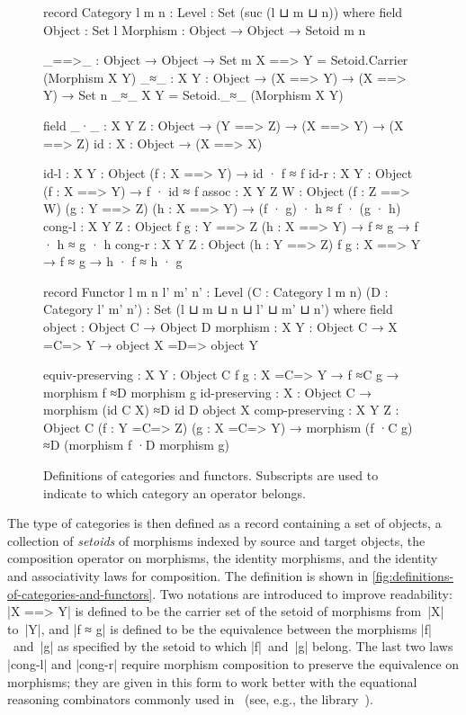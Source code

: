 \begin{figure}
\codefigure\small
\begin{code}
record Category {l m n : Level} : Set (suc (l ⊔ m ⊔ n)) where
  field
    Object    :  Set l
    Morphism  :  Object → Object → Setoid {m} {n}

  _==>_ : Object → Object → Set m
  X ==> Y = Setoid.Carrier (Morphism X Y)
  _≈_ : {X Y : Object} → (X ==> Y) → (X ==> Y) → Set n
  _≈_ {X} {Y} = Setoid._≈_ (Morphism X Y)

  field
    _·_  :   {X Y Z : Object} → (Y ==> Z) → (X ==> Y) → (X ==> Z)
    id   :   {X : Object} → (X ==> X)

    id-l    :  {X Y : Object} (f : X ==> Y) → id · f ≈ f
    id-r    :  {X Y : Object} (f : X ==> Y) → f · id ≈ f
    assoc   :  {X Y Z W : Object} (f : Z ==> W) (g : Y ==> Z) (h : X ==> Y) →
               (f · g) · h ≈ f · (g · h)
    cong-l  :  {X Y Z : Object} {f g : Y ==> Z} (h : X ==> Y) → f ≈ g → f · h ≈ g · h
    cong-r  :  {X Y Z : Object} (h : Y ==> Z) {f g : X ==> Y} → f ≈ g → h · f ≈ h · g

record Functor {l m n l' m' n' : Level}
  (C : Category {l} {m} {n}) (D : Category {l'} {m'} {n'}) :
  Set (l ⊔ m ⊔ n ⊔ l' ⊔ m' ⊔ n') where
  field
    object    :  Object C → Object D
    morphism  :  {X Y : Object C} → X =C=> Y → object X =D=> object Y

    equiv-preserving  :  {X Y : Object C} {f g : X =C=> Y} →
                         f ≈C g → morphism f ≈D morphism g
    id-preserving     :  {X : Object C} → morphism (id C {X}) ≈D id D {object X}
    comp-preserving   :  {X Y Z : Object C} (f : Y =C=> Z) (g : X =C=> Y) →
                         morphism (f ·C g) ≈D (morphism f ·D morphism g)
\end{code}
\caption{Definitions of categories and functors. Subscripts are used to indicate to which category an operator belongs.}
\label{fig:definitions-of-categories-and-functors}
\end{figure}

The type of categories is then defined as a record containing a set of objects, a collection of \emph{setoids} of morphisms indexed by source and target objects, the composition operator on morphisms, the identity morphisms, and the identity and associativity laws for composition.
The definition is shown in \autoref{fig:definitions-of-categories-and-functors}.
Two notations are introduced to improve readability: |X ==> Y| is defined to be the carrier set of the setoid of morphisms from~|X| to~|Y|, and |f ≈ g| is defined to be the equivalence between the morphisms |f|~and~|g| as specified by the setoid to which |f|~and~|g| belong.
The last two laws |cong-l| and |cong-r| require morphism composition to preserve the equivalence on morphisms; they are given in this form to work better with the equational reasoning combinators commonly used in \Agda\ (see, e.g., the  library~\citep{Mu-AoPA}).

